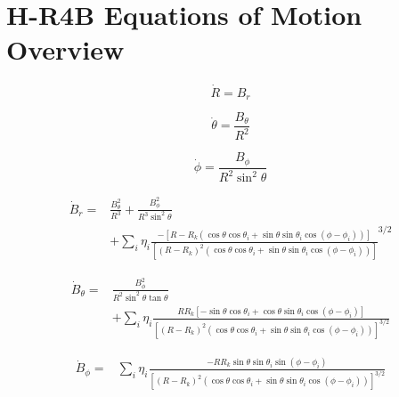 \chapter{H-R4B Equations of Motion Overview} \label{apx:hr4b-overview}

\begin{equation} \tag{2.67}
    \boxed{
            \dot{R} = B_r
    }
\end{equation}


\begin{equation} \tag{2.72}
    \boxed{
            \dot{\theta} = \frac{B_\theta}{R^2}
    }
\end{equation}


\begin{equation} \tag{2.76}
    \boxed{
            \dot{\phi} = \frac{B_\phi}{R^2 \sin^2{\theta}}
    }
\end{equation}


\begin{equation} \tag{2.86}
    \boxed{
        \!\begin{aligned}
        \dot{B}_r = &\frac{B_\theta^2}{R^3} + \frac{B_\phi^2}{R^3 \sin^2{\theta}} \\
        & + \sum\limits_{i} \eta_i \frac{-\left[R - R_k \left(\cos{\theta}\cos{\theta_i} + \sin{\theta}\sin{\theta_i}\cos{(\phi - \phi_i)}\right) \right]}{\left[(R - R_k)^2 \left(\cos{\theta}\cos{\theta_i} + \sin{\theta}\sin{\theta_i}\cos{(\phi - \phi_i)} \right) \right]}^{3/2}
        \end{aligned}
    }
\end{equation}


\begin{equation} \tag{2.87}
    \boxed{
        \!\begin{aligned}
            \dot{B}_\theta = &\frac{B_\phi^2}{R^2 \sin^2{\theta} \tan{\theta}} \\
            &+ \sum\limits_{i} \eta_i \frac{R R_k \left[-\sin{\theta}\cos{\theta_i} + \cos{\theta}\sin{\theta_i}\cos{(\phi - \phi_i)} \right]}{\left[(R - R_k)^2 \left(\cos{\theta}\cos{\theta_i} + \sin{\theta}\sin{\theta_i}\cos{(\phi - \phi_i)} \right) \right]^{3/2}}
        \end{aligned}
    }
\end{equation}


\begin{equation} \tag{2.88}
    \boxed{
        \!\begin{aligned}
            \dot{B}_\phi = &\sum\limits_{i} \eta_i \frac{- R R_k \sin{\theta}\sin{\theta_i}\sin{(\phi - \phi_i)}}{\left[(R - R_k)^2 \left(\cos{\theta}\cos{\theta_i} + \sin{\theta}\sin{\theta_i}\cos{(\phi - \phi_i)} \right) \right]^{3/2}}
        \end{aligned}
    }
\end{equation}
